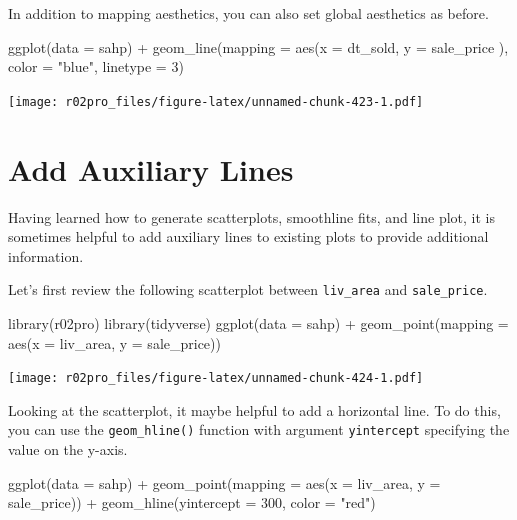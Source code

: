 \documentclass[
]{book}
\newenvironment{Shaded}{\begin{snugshade}}{\end{snugshade}}
\newcommand{\AttributeTok}[1]{\textcolor[rgb]{0.77,0.63,0.00}{#1}}
\newcommand{\DecValTok}[1]{\textcolor[rgb]{0.00,0.00,0.81}{#1}}
\newcommand{\FunctionTok}[1]{\textcolor[rgb]{0.00,0.00,0.00}{#1}}
\newcommand{\NormalTok}[1]{#1}
\newcommand{\SpecialCharTok}[1]{\textcolor[rgb]{0.00,0.00,0.00}{#1}}
\newcommand{\StringTok}[1]{\textcolor[rgb]{0.31,0.60,0.02}{#1}}
\begin{document}
In addition to mapping aesthetics, you can also set global aesthetics as before.

\begin{Shaded}
\begin{Highlighting}[]
\FunctionTok{ggplot}\NormalTok{(}\AttributeTok{data =}\NormalTok{ sahp) }\SpecialCharTok{+} \FunctionTok{geom\_line}\NormalTok{(}\AttributeTok{mapping =} \FunctionTok{aes}\NormalTok{(}\AttributeTok{x =}\NormalTok{ dt\_sold, }\AttributeTok{y =}\NormalTok{ sale\_price ), }\AttributeTok{color =} \StringTok{"blue"}\NormalTok{, }\AttributeTok{linetype =} \DecValTok{3}\NormalTok{)}
\end{Highlighting}
\end{Shaded}

\texttt{[image: r02pro\_files/figure-latex/unnamed-chunk-423-1.pdf]}

\hypertarget{add-auxiliary}{%
\section{Add Auxiliary Lines}\label{add-auxiliary}}

Having learned how to generate scatterplots, smoothline fits, and line plot, it is sometimes helpful to add auxiliary lines to existing plots to provide additional information.

Let's first review the following scatterplot between \texttt{liv\_area} and \texttt{sale\_price}.

\begin{Shaded}
\begin{Highlighting}[]
\FunctionTok{library}\NormalTok{(r02pro)}
\FunctionTok{library}\NormalTok{(tidyverse)}
\FunctionTok{ggplot}\NormalTok{(}\AttributeTok{data =}\NormalTok{ sahp) }\SpecialCharTok{+} \FunctionTok{geom\_point}\NormalTok{(}\AttributeTok{mapping =} \FunctionTok{aes}\NormalTok{(}\AttributeTok{x =}\NormalTok{ liv\_area, }\AttributeTok{y =}\NormalTok{ sale\_price))}
\end{Highlighting}
\end{Shaded}

\texttt{[image: r02pro\_files/figure-latex/unnamed-chunk-424-1.pdf]}

Looking at the scatterplot, it maybe helpful to add a horizontal line. To do this, you can use the \texttt{geom\_hline()} function with argument \texttt{yintercept} specifying the value on the y-axis.

\begin{Shaded}
\begin{Highlighting}[]
\FunctionTok{ggplot}\NormalTok{(}\AttributeTok{data =}\NormalTok{ sahp) }\SpecialCharTok{+} \FunctionTok{geom\_point}\NormalTok{(}\AttributeTok{mapping =} \FunctionTok{aes}\NormalTok{(}\AttributeTok{x =}\NormalTok{ liv\_area, }\AttributeTok{y =}\NormalTok{ sale\_price)) }\SpecialCharTok{+} \FunctionTok{geom\_hline}\NormalTok{(}\AttributeTok{yintercept =} \DecValTok{300}\NormalTok{, }\AttributeTok{color =} \StringTok{"red"}\NormalTok{)}
\end{Highlighting}
\end{Shaded}
\end{document}
